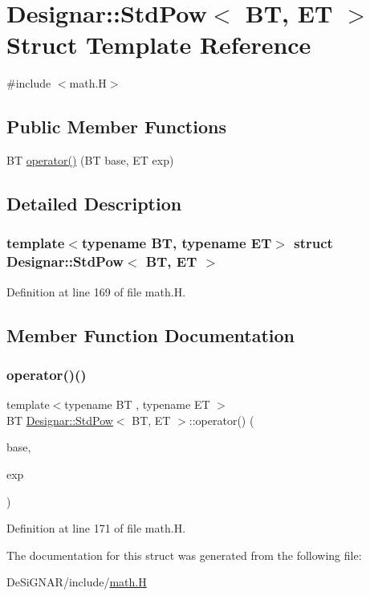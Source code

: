 \hypertarget{struct_designar_1_1_std_pow}{}\section{Designar\+:\+:Std\+Pow$<$ BT, ET $>$ Struct Template Reference}
\label{struct_designar_1_1_std_pow}


{\ttfamily \#include $<$math.\+H$>$}

\subsection*{Public Member Functions}
\begin{DoxyCompactItemize}
\item 
BT \hyperlink{struct_designar_1_1_std_pow_a76ed6112976493eda665ec60c537145f}{operator()} (BT base, ET exp)
\end{DoxyCompactItemize}


\subsection{Detailed Description}
\subsubsection*{template$<$typename BT, typename ET$>$\newline
struct Designar\+::\+Std\+Pow$<$ B\+T, E\+T $>$}



Definition at line 169 of file math.\+H.



\subsection{Member Function Documentation}
\mbox{\label{struct_designar_1_1_std_pow_a76ed6112976493eda665ec60c537145f}} 
\subsubsection{\texorpdfstring{operator()()}{operator()()}}
{\footnotesize\ttfamily template$<$typename BT , typename ET $>$ \\
BT \hyperlink{struct_designar_1_1_std_pow}{Designar\+::\+Std\+Pow}$<$ BT, ET $>$\+::operator() (\begin{DoxyParamCaption}\item[{BT}]{base,  }\item[{ET}]{exp }\end{DoxyParamCaption})\hspace{0.3cm}{\ttfamily [inline]}}



Definition at line 171 of file math.\+H.



The documentation for this struct was generated from the following file\+:\begin{DoxyCompactItemize}
\item 
De\+Si\+G\+N\+A\+R/include/\hyperlink{math_8_h}{math.\+H}\end{DoxyCompactItemize}

